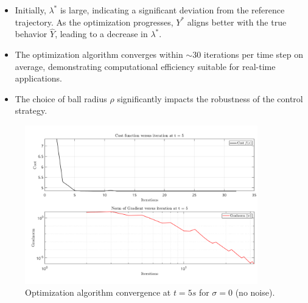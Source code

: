 \begin{itemize}
    \item Initially, $\lambda^*$ is large, indicating a significant deviation from the reference trajectory. As the optimization progresses, $Y^*$ aligns better with the true behavior $\hat{Y}$, leading to a decrease in $\lambda^*$.
    \item The optimization algorithm converges within $\sim 30$ iterations per time step on average, demonstrating computational efficiency suitable for real-time applications.
    \item The choice of ball radius $\rho$ significantly impacts the robustness of the control strategy.
\end{itemize}
\begin{figure}[h!]
    \centering
    \includegraphics[width=0.9\textwidth]{figures/cost_gradnorm_noiseless_gamma_5_rho_0p1.png}
    \caption{Optimization algorithm convergence at $t=5s$ for $\sigma = 0$ (no noise).}
    \label{fig:conv_noiseless}
\end{figure}

